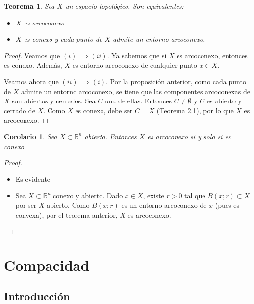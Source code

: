 \documentclass[12pt]{report}
\newtheorem{corollary}{Corolario}[chapter]
\newtheorem{theorem}{Teorema}[chapter]
\theoremstyle{definition}
\theoremstyle{definition}
\theoremstyle{remark}
\newcommand{\R}{\mathbb R}
\begin{document}
\begin{theorem}
Sea $X$ un espacio topológico. Son equivalentes:
\begin{itemize}
    \item[(i)] $X$ es arcoconexo.
    \item[(ii)] $X$ es conexo y cada punto de $X$ admite un entorno arcoconexo.
\end{itemize}
\end{theorem}

\begin{proof}
Veamos que $(i) \implies (ii)$. Ya sabemos que si $X$ es arcoconexo, entonces es conexo. Además, $X$ es entorno arcoconexo de cualquier punto $x \in X$.

\vspace{2mm}
Veamos ahora que $(ii) \implies (i)$. Por la proposición anterior, como cada punto de $X$ admite un entorno arcoconexo, se tiene que las componentes arcoconexas de $X$ son abiertos y cerrados. Sea $C$ una de ellas. Entonces $C \neq \emptyset$ y $C$ es abierto y cerrado de $X$. Como $X$ es conexo, debe ser $C = X$ (\hyperref[teo2.1.]{\color{blue}Teorema 2.1}), por lo que $X$ es arcoconexo.
\end{proof}

\begin{corollary}
Sea $X \subset \R^n$ abierto. Entonces $X$ es arcoconexo si y solo si es conexo.
\end{corollary}

\begin{proof}
\hfill
\begin{itemize}
    \item[{\fbox[rb]{$\Rightarrow$}}] Es evidente.
    \item[{\fbox[rb]{$\Leftarrow$}}] Sea $X \subset \R^n$ conexo y abierto. Dado $x \in X$, existe $r > 0$ tal que $B(x;r) \subset X$ por ser $X$ abierto. Como $B(x;r)$ es un entorno arcoconexo de $x$ (pues es convexa), por el teorema anterior, $X$ es arcoconexo.
\end{itemize}
\end{proof}

\chapter{Compacidad}

\section{Introducción}
\end{document}
